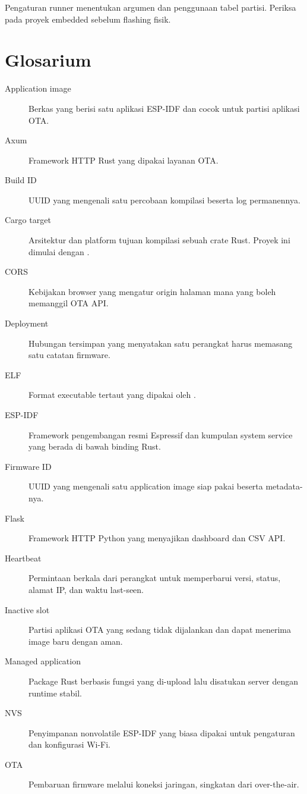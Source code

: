 Pengaturan runner menentukan argumen  dan penggunaan tabel partisi. Periksa  pada proyek embedded sebelum flashing fisik.

\section{Glosarium}

\begin{description}
  \item[Application image] Berkas  yang berisi satu aplikasi ESP-IDF dan cocok untuk partisi aplikasi OTA.
  \item[Axum] Framework HTTP Rust yang dipakai layanan OTA.
  \item[Build ID] UUID yang mengenali satu percobaan kompilasi beserta log permanennya.
  \item[Cargo target] Arsitektur dan platform tujuan kompilasi sebuah crate Rust. Proyek ini dimulai dengan .
  \item[CORS] Kebijakan browser yang mengatur origin halaman mana yang boleh memanggil OTA API.
  \item[Deployment] Hubungan tersimpan yang menyatakan satu perangkat harus memasang satu catatan firmware.
  \item[ELF] Format executable tertaut yang dipakai oleh .
  \item[ESP-IDF] Framework pengembangan resmi Espressif dan kumpulan system service yang berada di bawah binding Rust.
  \item[Firmware ID] UUID yang mengenali satu application image siap pakai beserta metadata-nya.
  \item[Flask] Framework HTTP Python yang menyajikan dashboard dan CSV API.
  \item[Heartbeat] Permintaan berkala dari perangkat untuk memperbarui versi, status, alamat IP, dan waktu last-seen.
  \item[Inactive slot] Partisi aplikasi OTA yang sedang tidak dijalankan dan dapat menerima image baru dengan aman.
  \item[Managed application] Package Rust berbasis fungsi yang di-upload lalu disatukan server dengan runtime stabil.
  \item[NVS] Penyimpanan nonvolatile ESP-IDF yang biasa dipakai untuk pengaturan dan konfigurasi Wi-Fi.
  \item[OTA] Pembaruan firmware melalui koneksi jaringan, singkatan dari over-the-air.

\end{description}
